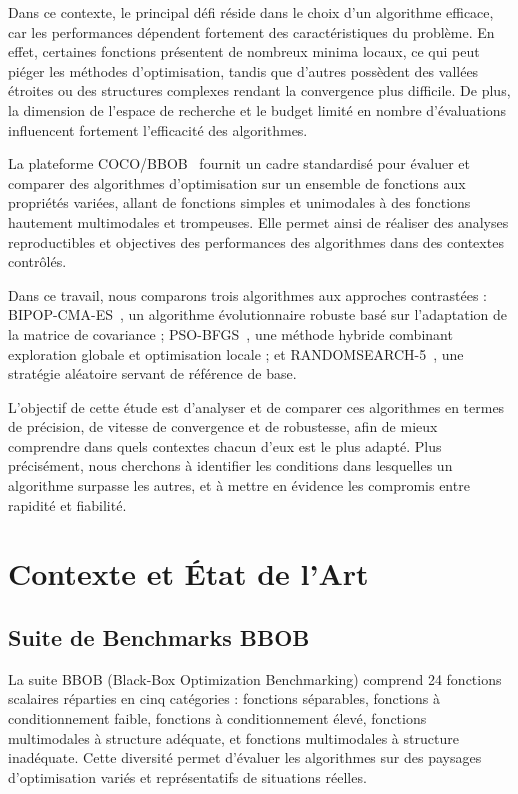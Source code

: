 \documentclass[conference]{IEEEtran}
\begin{document}
Dans ce contexte, le principal d\'efi r\'eside dans le choix d'un algorithme efficace, car les performances d\'ependent fortement des caract\'eristiques du probl\`eme. En effet, certaines fonctions pr\'esentent de nombreux minima locaux, ce qui peut pi\'eger les m\'ethodes d'optimisation, tandis que d'autres poss\`edent des vall\'ees \'etroites ou des structures complexes rendant la convergence plus difficile. De plus, la dimension de l'espace de recherche et le budget limit\'e en nombre d'\'evaluations influencent fortement l'efficacit\'e des algorithmes.

La plateforme COCO/BBOB~\cite{hansen2021coco} fournit un cadre standardis\'e pour \'evaluer et comparer des algorithmes d'optimisation sur un ensemble de fonctions aux propri\'et\'es vari\'ees, allant de fonctions simples et unimodales \`a des fonctions hautement multimodales et trompeuses. Elle permet ainsi de r\'ealiser des analyses reproductibles et objectives des performances des algorithmes dans des contextes contr\^ol\'es.

Dans ce travail, nous comparons trois algorithmes aux approches contrast\'ees : BIPOP-CMA-ES~\cite{hansen2009bipop}, un algorithme \'evolutionnaire robuste bas\'e sur l'adaptation de la matrice de covariance ; PSO-BFGS~\cite{voglis2012mempsode}, une m\'ethode hybride combinant exploration globale et optimisation locale ; et RANDOMSEARCH-5~\cite{brockhoff2017randomsearch}, une strat\'egie al\'eatoire servant de r\'ef\'erence de base.

L'objectif de cette \'etude est d'analyser et de comparer ces algorithmes en termes de pr\'ecision, de vitesse de convergence et de robustesse, afin de mieux comprendre dans quels contextes chacun d'eux est le plus adapt\'e. Plus pr\'ecis\'ement, nous cherchons \`a identifier les conditions dans lesquelles un algorithme surpasse les autres, et \`a mettre en \'evidence les compromis entre rapidit\'e et fiabilit\'e.

\section{Contexte et \'Etat de l'Art}

\subsection{Suite de Benchmarks BBOB}

La suite BBOB (Black-Box Optimization Benchmarking) comprend 24 fonctions scalaires r\'eparties en cinq cat\'egories : fonctions s\'eparables, fonctions \`a conditionnement faible, fonctions \`a conditionnement \'elev\'e, fonctions multimodales \`a structure ad\'equate, et fonctions multimodales \`a structure inad\'equate. Cette diversit\'e permet d'\'evaluer les algorithmes sur des paysages d'optimisation vari\'es et repr\'esentatifs de situations r\'eelles.
\end{document}

